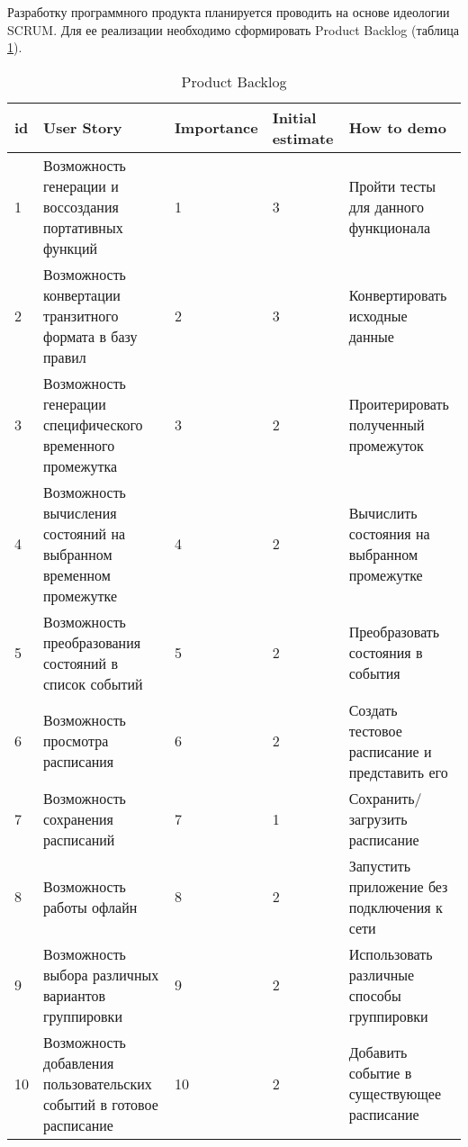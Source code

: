 Разработку программного продукта планируется проводить на основе идеологии SCRUM.
Для ее реализации необходимо сформировать Product Backlog (таблица \ref{tbl:product-backlog}).

{
\small
{}
\begin{longtable}{| p{0.5cm} | p{5cm} | p{2cm} | p{1.5cm} | p{4.8cm} |}
  \caption{Product Backlog} \label{tbl:product-backlog} \\
  \hline id & User Story                                                           & Importance & Initial estimate & How to demo \\
  \hline 1  & Возможность генерации и воссоздания портативных функций              & 1          & 3                & Пройти тесты для данного функционала \\
  \hline 2  & Возможность конвертации транзитного формата в базу правил            & 2          & 3                & Конвертировать исходные данные \\
  \hline 3  & Возможность генерации специфического временного промежутка           & 3          & 2                & Проитерировать полученный промежуток \\
  \hline 4  & Возможность вычисления состояний на выбранном временном промежутке   & 4          & 2                & Вычислить состояния на выбранном промежутке \\
  \hline 5  & Возможность преобразования состояний в список событий                & 5          & 2                & Преобразовать состояния в события \\
  \hline 6  & Возможность просмотра расписания                                     & 6          & 2                & Создать тестовое расписание и представить его \\
  \hline 7  & Возможность сохранения расписаний                                    & 7          & 1                & Сохранить/загрузить расписание \\
  \hline 8  & Возможность работы офлайн                                            & 8          & 2                & Запустить приложение без подключения к сети \\
  \hline 9  & Возможность выбора различных вариантов группировки                   & 9          & 2                & Использовать различные способы группировки \\
  \hline 10 & Возможность добавления пользовательских событий в готовое расписание & 10         & 2                & Добавить событие в существующее расписание \\
  \hline
\end{longtable}
}

\clearpage